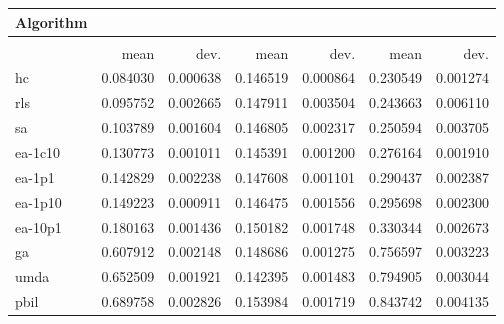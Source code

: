 \begin{tabular}{@{} l *{6}{>{{}}N{1}{2}} @{}}
\toprule
{Algorithm} &  \\
\midrule
&  &  &  \\
\midrule
& {mean} & {dev.} & {mean} & {dev.} & {mean} & {dev.} \\
\midrule
hc & 0.084030 & 0.000638 & 0.146519 & 0.000864 & 0.230549 & 0.001274 \\
rls & 0.095752 & 0.002665 & 0.147911 & 0.003504 & 0.243663 & 0.006110 \\
sa & 0.103789 & 0.001604 & 0.146805 & 0.002317 & 0.250594 & 0.003705 \\
ea-1c10 & 0.130773 & 0.001011 & 0.145391 & 0.001200 & 0.276164 & 0.001910 \\
ea-1p1 & 0.142829 & 0.002238 & 0.147608 & 0.001101 & 0.290437 & 0.002387 \\
ea-1p10 & 0.149223 & 0.000911 & 0.146475 & 0.001556 & 0.295698 & 0.002300 \\
ea-10p1 & 0.180163 & 0.001436 & 0.150182 & 0.001748 & 0.330344 & 0.002673 \\
ga & 0.607912 & 0.002148 & 0.148686 & 0.001275 & 0.756597 & 0.003223 \\
umda & 0.652509 & 0.001921 & 0.142395 & 0.001483 & 0.794905 & 0.003044 \\
pbil & 0.689758 & 0.002826 & 0.153984 & 0.001719 & 0.843742 & 0.004135 \\
\bottomrule
\end{tabular}
